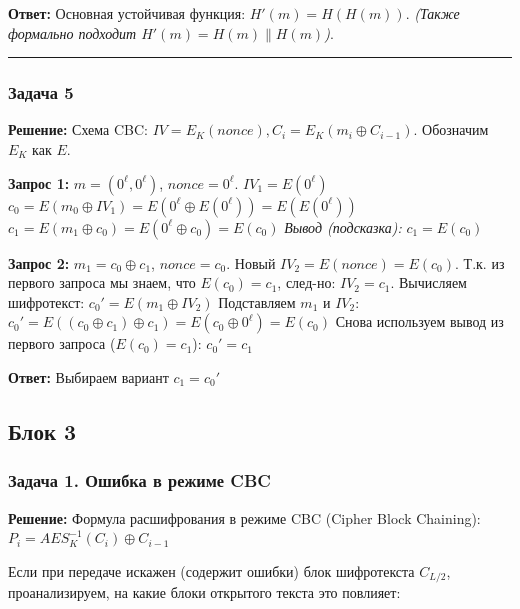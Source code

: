 \textbf{Ответ:} Основная устойчивая функция: \textbf{\(H'(m) = H(H(m))\)}. \emph{(Также формально подходит \(H'(m) = H(m) \parallel H(m)\))}.

\begin{center}\rule{0.5\linewidth}{0.5pt}\end{center}

\subsubsection{Задача 5}\label{ux437ux430ux434ux430ux447ux430-5}

\textbf{Решение:} Схема CBC: \(IV = E_K(nonce), C_i = E_K(m_i \oplus C_{i-1})\). Обозначим \(E_K\) как \(E\).

\textbf{Запрос 1:} \(m = (0^\ell, 0^\ell)\), \(nonce = 0^\ell\). \(IV_1 = E(0^\ell)\) \(c_0 = E(m_0 \oplus IV_1) = E(0^\ell \oplus E(0^\ell)) = E(E(0^\ell))\) \(c_1 = E(m_1 \oplus c_0) = E(0^\ell \oplus c_0) = E(c_0)\) \emph{Вывод (подсказка):} \textbf{\(c_1 = E(c_0)\)}

\textbf{Запрос 2:} \(m_1 = c_0 \oplus c_1\), \(nonce = c_0\). Новый \(IV_2 = E(nonce) = E(c_0)\). Т.к. из первого запроса мы знаем, что \(E(c_0) = c_1\), след-но: \textbf{\(IV_2 = c_1\)}. Вычисляем шифротекст: \(c_0' = E(m_1 \oplus IV_2)\) Подставляем \(m_1\) и \(IV_2\): \(c_0' = E((c_0 \oplus c_1) \oplus c_1) = E(c_0 \oplus 0^\ell) = E(c_0)\) Снова используем вывод из первого запроса (\(E(c_0) = c_1\)): \textbf{\(c_0' = c_1\)}

\textbf{Ответ:} Выбираем вариант \textbf{\(c_1 = c_0'\)}

\subsection{Блок 3}\label{ux431ux43bux43eux43a-3}

\subsubsection{Задача 1. Ошибка в режиме CBC}\label{ux437ux430ux434ux430ux447ux430-1.-ux43eux448ux438ux431ux43aux430-ux432-ux440ux435ux436ux438ux43cux435-cbc}

\textbf{Решение:} Формула расшифрования в режиме CBC (Cipher Block Chaining): \(P_i = AES^{-1}_K(C_i) \oplus C_{i-1}\)

Если при передаче искажен (содержит ошибки) блок шифротекста \(C_{L/2}\), проанализируем, на какие блоки открытого текста это повлияет:


